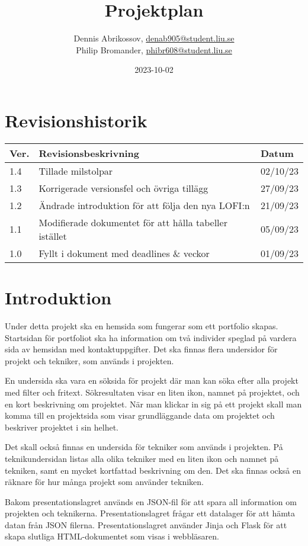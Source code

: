 \documentclass{liu_mall}
\author{Dennis Abrikossov, \url{denab905@student.liu.se}\\
  Philip Bromander, \url{phibr608@student.liu.se}}
\title{Projektplan}
\date{2023-10-02}
\begin{document}
    \projectpage
    \section{Revisionshistorik}
        \begin{table}[!h]
            \begin{tabularx}{\linewidth}{|l|X|l|}
                \hline
                Ver. & Revisionsbeskrivning & Datum \\\hline
                1.4 & Tillade milstolpar & 02/10/23\\\hline
                1.3 & Korrigerade versionsfel och övriga tillägg & 27/09/23\\\hline
                1.2 & Ändrade introduktion för att följa den nya LOFI:n & 21/09/23\\\hline
                1.1 & Modifierade dokumentet för att hålla tabeller istället & 05/09/23\\\hline
                1.0 & Fyllt i dokument med deadlines \& veckor & 01/09/23\\\hline
            \end{tabularx}
        \end{table}

\newpage
\section{Introduktion}
    Under detta projekt ska en hemsida som fungerar som ett portfolio skapas. Startsidan för portfoliot ska ha information om två individer speglad på vardera sida av hemsidan med kontaktuppgifter. Det ska finnas flera undersidor för projekt och tekniker, som används i projekten.

    En undersida ska vara en söksida för projekt där man kan söka efter alla projekt med filter och fritext. Sökresultaten visar en liten ikon, namnet på projektet, och en kort beskrivning om projektet. När man klickar in sig på ett projekt skall man komma till en projektsida som visar grundläggande data om projektet och beskriver projektet i sin helhet.

    Det skall också finnas en undersida för tekniker som används i projekten. På teknikundersidan listas alla olika tekniker med en liten ikon och namnet på tekniken, samt en mycket kortfattad beskrivning om den. Det ska finnas också en räknare för hur många projekt som använder tekniken.

    Bakom presentationslagret används en JSON-fil för att spara all information om projekten och teknikerna. Presentationslagret frågar ett datalager för att hämta datan från JSON filerna. Presentationslagret använder Jinja och Flask för att skapa slutliga HTML-dokumentet som visas i webbläsaren.
\end{document}
